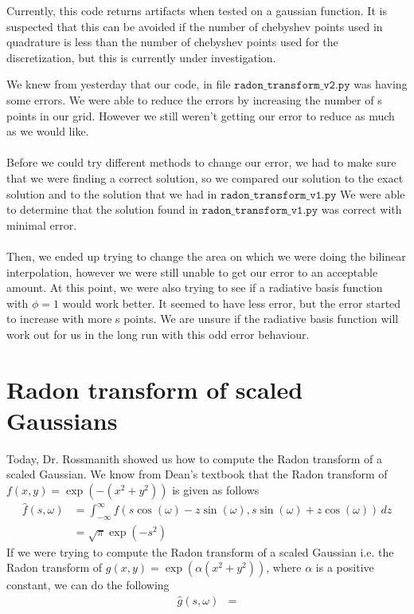 \documentclass[12pt]{article}
\begin{document}
Currently, this code returns artifacts when tested on a gaussian function. 
It is suspected that this can be avoided if the number of chebyshev points used in quadrature is less than the number of chebyshev points used for the discretization, but this is currently under investigation.

We knew from yesterday that our code, in file $\texttt{radon\_transform\_v2.py}$ was having some errors. We were able to reduce the errors by increasing the number of s points in our grid. However we still weren't getting our error to reduce as much as we would like. \\ \\
 Before we could try different methods to change our error, we had to make sure that we were finding a correct solution, so we compared our solution to the exact solution and to the solution that we had in $\texttt{radon\_transform\_v1.py}$ We were able to determine that the solution found in $\texttt{radon\_transform\_v1.py}$ was correct with minimal error. \\ \\
 Then, we ended up trying to change the area on which we were doing the bilinear interpolation, however we were still unable to get our error to an acceptable amount. At this point, we were also trying to see if a radiative basis function with $\phi = 1$ would work better. It seemed to have less error, but the error started to increase with more s points. We are unsure if the radiative basis function will work out for us in the long run with this odd error behaviour.

\section*{Radon transform of scaled Gaussians}
Today, Dr. Rossmanith showed us how to compute the Radon transform of a scaled Gaussian.
We know from Dean's textbook that the Radon transform of $f(x, y) = \exp (-(x^{2} + y^{2}))$ is given as follows
\begin{align*}
\hat{f} (s, \omega) & = \int_{-\infty}^{\infty} f(s \cos (\omega) - z \sin (\omega), s \sin (\omega) + z \cos (\omega)) \, dz \\
& = \sqrt{\pi} \exp(-s^{2})
\end{align*}
If we were trying to compute the Radon transform of a scaled Gaussian i.e. the Radon transform of $g(x, y) = \exp (\alpha (x^{2} + y^{2}))$, where $\alpha$ is a positive constant, we can do the following
\begin{align*}
\hat{g} (s, \omega) & = 
\end{align*}
\end{document}
